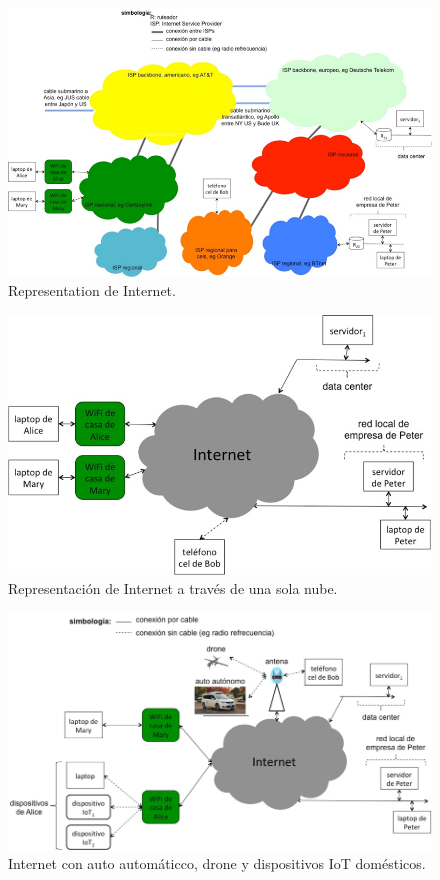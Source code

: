 \documentclass[12pt]{report} %
\begin{document}
\begin{figure}
\centering
\includegraphics[width=0.85\columnwidth]{imagenes/toroloco.png}
\caption{Representation de Internet.}
\label{figrepresentaciondeinternetnubes}
\end{figure} 


\begin{figure}
\centering
\includegraphics[width=0.85\columnwidth]{imagenes/pezplata.png}
\caption{Representación de Internet a través de una sola nube.}
\label{fig:representaciondeinternetunanube}
\end{figure} 


\begin{figure}
\centering
\includegraphics[width=0.98\columnwidth]{imagenes/IoTinternetautodrone.png}
\caption{Internet con auto automáticco, drone y dispositivos IoT domésticos.}
\label{fig:IoTinternetautoautodrone}
\end{figure} 
\end{document}
